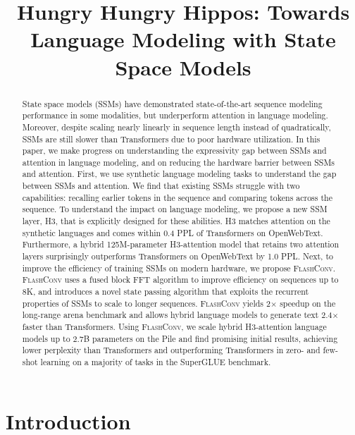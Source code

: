 \title{Hungry Hungry Hippos: Towards Language Modeling with State Space Models}

\begin{abstract}
State space models (SSMs) have demonstrated state-of-the-art sequence modeling performance in some modalities, but underperform attention in language modeling. Moreover, despite scaling nearly linearly in sequence length instead of quadratically, SSMs are still slower than Transformers due to poor hardware utilization. In this paper, we make progress on understanding the expressivity gap between SSMs and attention in language modeling, and on reducing the hardware barrier between SSMs and attention. First, we use synthetic language modeling tasks to understand the gap between SSMs and attention. We find that existing SSMs struggle with two capabilities: recalling earlier tokens in the sequence and comparing tokens across the sequence. To understand the impact on language modeling, we propose a new SSM layer, \textsc{H3}, that is explicitly designed for these abilities.
\textsc{H3} matches attention on the synthetic languages and comes within 0.4 PPL of Transformers on OpenWebText. Furthermore, a hybrid 125M-parameter \textsc{H3}-attention model that retains two attention layers surprisingly outperforms Transformers on OpenWebText by 1.0 PPL. Next, to improve the efficiency of training SSMs on modern hardware, we propose \textsc{FlashConv}.
\textsc{FlashConv} uses a fused block FFT algorithm to improve efficiency on sequences up to 8K, and introduces a novel state passing algorithm that exploits the recurrent properties of SSMs to scale to longer sequences.
\textsc{FlashConv} yields 2$\times$ speedup on the long-range arena benchmark and allows hybrid language models to generate text 2.4$\times$ faster than Transformers. Using \textsc{FlashConv}, we scale hybrid \textsc{H3}-attention language models up to 2.7B parameters on the Pile and find promising initial results, achieving lower perplexity than Transformers and outperforming Transformers in zero- and few-shot learning on a majority of tasks in the SuperGLUE benchmark.
\end{abstract}

\section{Introduction}
\label{sec:intro}

